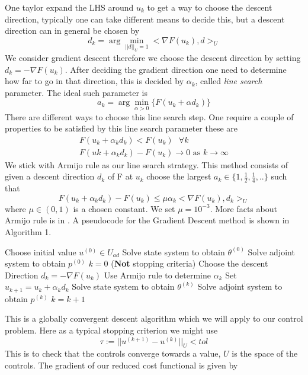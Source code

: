 One taylor expand the LHS around $u_k$ to get a way to choose the descent direction, typically one can take different means to decide this, but a descent direction can in general be chosen by 
\begin{equation*}
    d_k = \arg \min _{||d||_U=1} <\nabla F(u_k), d>_U
\end{equation*}
We consider gradient descent therefore we choose the descent direction by setting $d_k = -\nabla F(u_k)$. After deciding the gradient direction one need to determine how far to go in that direction, this is decided by $\alpha_k$, called \textit{line search} parameter. The ideal such parameter is 
\begin{equation*}
    a_k = \arg \min_{\alpha>0} \{ F(u_k + \alpha d_k) \}
\end{equation*}
There are different ways to choose this line search step. One require a couple of properties to be satisfied by this line search parameter these are
\begin{align*}
    F(u_k + \alpha_kd_k) < F(u_k) \text{  } \forall k \\
    F(uk + \alpha_k d_k) - F(u_k) \rightarrow 0 \text{ as } k\rightarrow \infty
\end{align*}
We stick with Armijo rule as our line search strategy. This method consists of given a descent direction $d_k$ of F at $u_k$ choose the largest $a_k \in \{ 1, \frac{1}{2},\frac{1}{4},.. \}$ such that
\begin{equation*}
    F(u_k + \alpha_kd_k) - F(u_k) \leq \mu \alpha_k <\nabla F(u_k),d_k>_U
\end{equation*}
where $\mu \in (0,1)$ is a chosen constant. We set $\mu = 10^{-3}$. More facts about Armijo rule is in \cite{numMethods}. A pseudocode for the Gradient Descent method is shown in Algorithm 1. 

\begin{codebox}
\li Choose initial value $u^{(0)}\in U_{ad}$
\li Solve state system to obtain $\theta^{(0)}$
\li Solve adjoint system to obtain $p^{(0)}$
\li $k=0$
\li \While (\textbf{Not} stopping criteria) \Then
\li Choose the descent Direction $d_k = -\nabla F(u_k)$
\li Use Armijo rule to determine $\alpha_k$
\li Set $u_{k+1} = u_k + \alpha_k d_k$
\li Solve state system to obtain $\theta^{(k)}$
\li Solve adjoint system to obtain $p^{(k)}$
\li $k = k +1$
\end{codebox}
This is a globally convergent descent algorithm which we will apply to our control problem. Here as a typical stopping criterion we might use 
\begin{equation}
    \label{eq:stopping}
    \tau := ||u^{(k+1)} - u^{(k)}||_U < tol
\end{equation}
This is to check that the controls converge towards a value, $U$ is the space of the controls. The gradient of our reduced cost functional is given by

